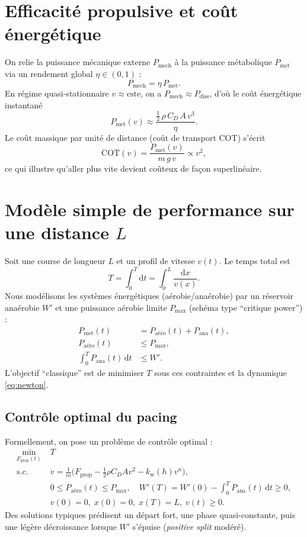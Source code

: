 \documentclass[11pt,a4paper]{article}
\newcommand{\dd}{\mathrm{d}}
\begin{document}
\section{Efficacité propulsive et coût énergétique}
On relie la puissance mécanique externe $P_{\mathrm{mech}}$ à la puissance métabolique $P_{\mathrm{met}}$ via un rendement global $\eta\in(0,1)$ :
\begin{equation}
 P_{\mathrm{mech}} = \eta\, P_{\mathrm{met}}.
 \end{equation}
En régime quasi-stationnaire $v\approx\text{cste}$, on a $P_{\mathrm{mech}}\approx P_{\mathrm{diss}}$, d'où le coût énergétique instantané
\begin{equation}
 P_{\mathrm{met}}(v) \approx \frac{\tfrac{1}{2}\,\rho\,C_D\,A\,v^3}{\eta}.
 \end{equation}
Le coût massique par unité de distance (coût de transport $\mathrm{COT}$) s'écrit
\begin{equation}
 \mathrm{COT}(v) = \frac{P_{\mathrm{met}}(v)}{m\,g\,v} \propto v^2, 
 \end{equation}
ce qui illustre qu'aller plus vite devient coûteux de façon superlinéaire.

\section{Modèle simple de performance sur une distance $L$}
Soit une course de longueur $L$ et un profil de vitesse $v(t)$. Le temps total est
\begin{equation}
 T = \int_0^{T} \dd t = \int_0^{L} \frac{\dd x}{v(x)}.
 \end{equation}
Nous modélisons les systèmes énergétiques (aérobie/anaérobie) par un réservoir anaérobie $W'$ et une puissance aérobie limite $P_{\max}$ (schéma type ``critique power'') :
\begin{align}
 P_{\mathrm{met}}(t) &= P_\mathrm{aéro}(t) + P_\mathrm{ana}(t), \\
 P_\mathrm{aéro}(t) &\le P_{\max}, \\
 \int_0^T P_\mathrm{ana}(t)\,\dd t &\le W'.
 \end{align}
L'objectif ``classique'' est de minimiser $T$ sous ces contraintes et la dynamique \eqref{eq:newton}.

\subsection{Contrôle optimal du pacing}
Formellement, on pose un problème de contrôle optimal :
\begin{align}
 \min_{F_{\mathrm{prop}}(t)}\; &T \\
 \text{s.c. }\; &\dot v = \frac{1}{m}\Big(F_{\mathrm{prop}} - \tfrac{1}{2}\rho C_D A v^2 - k_\mathrm{w}(h)v^n\Big), \\
 &0\le P_\mathrm{aéro}(t)\le P_{\max},\quad W'(T)=W'(0)-\int_0^T P_\mathrm{ana}(t)\,\dd t\ge 0, \\
 &v(0)=0,\; x(0)=0,\; x(T)=L,\; v(t)\ge 0.
 \end{align}
Des solutions typiques prédisent un départ fort, une phase quasi-constante, puis une légère décroissance lorsque $W'$ s'épuise (\emph{positive split} modéré).
\end{document}

